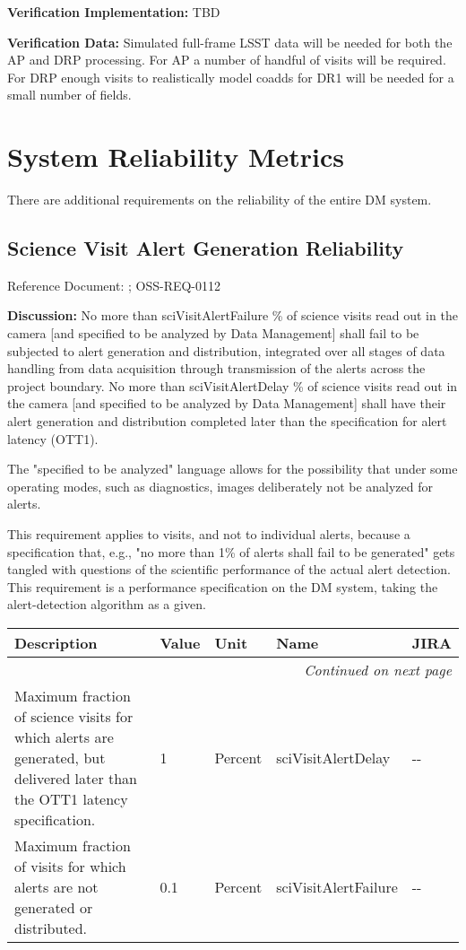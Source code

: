 \documentclass[DM,lsstdraft,toc]{lsstdoc}
\makeatletter
\newenvironment{metric}[0]{%
\setlength\LTleft{0pt}
\setlength\LTright{\fill}
\begin{longtable}[]{@{}p{0.4\textwidth}lp{0.75in}p{1.3in}p{0.75in}@{}}

\hline \textbf{Description} & \textbf{Value} & \textbf{Unit} & \textbf{Name} & \textbf{JIRA} \\ \hline
\endhead

\hline \multicolumn{5}{r}{\emph{Continued on next page}} \\
\endfoot

\hline\hline
\endlastfoot
}{%
\hline
\end{longtable}
}
\makeatother
\begin{document}
\textbf{Verification Implementation:} TBD

\textbf{Verification Data:} Simulated full-frame LSST data will be
needed for both the AP and DRP processing. For AP a number of handful of
visits will be required. For DRP enough visits to realistically model
coadds for DR1 will be needed for a small number of fields.

\section{System Reliability Metrics}\label{system-reliability-metrics}

There are additional requirements on the reliability of the entire DM
system.

\subsection{Science Visit Alert Generation
Reliability}\label{science-visit-alert-generation-reliability}

Reference Document: ; OSS-REQ-0112

\textbf{Discussion:} No more than sciVisitAlertFailure \% of science
visits read out in the camera {[}and specified to be analyzed by Data
Management{]} shall fail to be subjected to alert generation and
distribution, integrated over all stages of data handling from data
acquisition through transmission of the alerts across the project
boundary. No more than sciVisitAlertDelay \% of science visits read out
in the camera {[}and specified to be analyzed by Data Management{]}
shall have their alert generation and distribution completed later than
the \SRD specification for alert latency (OTT1).

The "specified to be analyzed" language allows for the possibility that
under some operating modes, such as diagnostics, images deliberately not
be analyzed for alerts.

This requirement applies to visits, and not to individual alerts,
because a specification that, e.g., "no more than 1\% of alerts shall
fail to be generated" gets tangled with questions of the scientific
performance of the actual alert detection. This requirement is a
performance specification on the DM system, taking the alert-detection
algorithm as a given.

\begin{metric}
Maximum fraction of science visits for which alerts are generated, but
delivered later than the OTT1 latency specification. & 1 & Percent &
sciVisitAlertDelay & -\/-\tabularnewline
Maximum fraction of visits for which alerts are not generated or
distributed. & 0.1 & Percent & sciVisitAlertFailure &
-\/-\tabularnewline
\end{metric}
\end{document}
